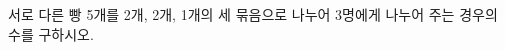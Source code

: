 \hspace*{2mm}\begin{minipage}[t]{\dimexpr\linewidth-2mm\relax}\vspace{0pt}
서로 다른 빵 5개를 2개, 2개, 1개의 세 묶음으로 나누어 3명에게 나누어 주는 경우의 수를 구하시오.\end{minipage}
